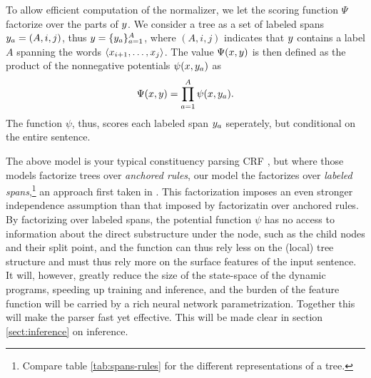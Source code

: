   To allow efficient computation of the normalizer, we let the scoring function $\Psi$ factorize over the parts of $y$. We consider a tree as a set of labeled spans $y_a = (A, i, j)$, thus $y = \{ y_a \}_{a=1}^A$, where $(A, i, j)$ indicates that $y$ contains a label $A$ spanning the words $\langle x_{i+1}, \dots, x_j \rangle$. The value $\Psi(x, y)$ is then defined as the product of the nonnegative potentials $\psi(x, y_a)$ as
  \begin{align}
    \Psi(x, y) = \prod_{a=1}^A \psi(x, y_a).
  \end{align}
  The function $\psi$, thus, scores each labeled span $y_a$ seperately, but conditional on the entire sentence.

  The above model is your typical constituency parsing CRF \citep{finkel2008crf,klein2015crf}, but where those models factorize trees over \textit{anchored rules}, our model the factorizes over \textit{labeled spans},\footnote{Compare table \ref{tab:spans-rules} for the different representations of a tree.} an approach first taken in \citet{stern2017minimal}. This factorization imposes an even stronger independence assumption than that imposed by factorizatin over anchored rules. By factorizing over labeled spans, the potential function $\psi$ has no access to information about the direct substructure under the node, such as the child nodes and their split point, and the function can thus rely less on the (local) tree structure and must thus rely more on the surface features of the input sentence. It will, however, greatly reduce the size of the state-space of the dynamic programs, speeding up training and inference, and the burden of the feature function will be carried by a rich neural network parametrization. Together this will make the parser fast yet effective. This will be made clear in section \ref{sect:inference} on inference.

